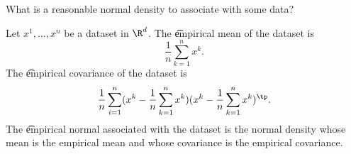 
What is a reasonable normal density to associate with some data?


Let $x^1, \dots , x^n$ be a dataset in $\R ^d$.
The \t{empirical mean} of the dataset is
  \[
\frac{1}{n} \sum_{k = 1}^{n} x^k.
  \]
The \t{empirical covariance} of the dataset is
  \[
\frac{1}{n} \sum_{i = 1}^{n} (x^k - \frac{1}{n} \sum_{k = 1}^{n} x^k) (x^k - \frac{1}{n} \sum_{k = 1}^{n} x^k)^{\tp}.
  \]
The \t{empirical normal} associated with the dataset is the normal density whose mean is the empirical mean and whose covariance is the empirical covariance.
